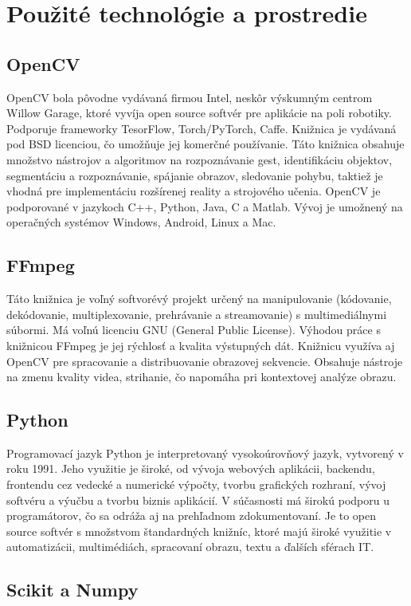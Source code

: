 \section{Použité technológie a prostredie}
\subsection{OpenCV}
\acrfull{OpenCV} bola pôvodne vydávaná firmou Intel, neskôr výskumným centrom Willow Garage, ktoré vyvíja open source softvér pre aplikácie na poli robotiky. Podporuje frameworky TesorFlow, Torch/PyTorch, Caffe. Knižnica je vydávaná pod BSD licenciou, čo umožňuje jej komerčné používanie. Táto knižnica obsahuje množstvo nástrojov a algoritmov na rozpoznávanie gest, identifikáciu objektov, segmentáciu a rozpoznávanie, spájanie obrazov, sledovanie pohybu, taktiež je vhodná pre implementáciu rozšírenej reality a strojového učenia. OpenCV je podporované v jazykoch C++, Python, Java, C a Matlab. Vývoj je umožnený na operačných systémov Windows, Android, Linux a Mac. \cite{c4}


\subsection{FFmpeg}
Táto knižnica je voľný softvorévý projekt určený na manipulovanie (kódovanie, dekódovanie, multiplexovanie, prehrávanie a streamovanie) s multimediálnymi súbormi. Má voľnú licenciu GNU (General Public License). Výhodou práce s knižnicou FFmpeg je jej rýchlosť a kvalita výstupných dát. Knižnicu využíva aj OpenCV pre spracovanie a distribuovanie obrazovej sekvencie. Obsahuje nástroje na zmenu kvality videa, strihanie, čo napomáha pri kontextovej analýze obrazu.\cite{c9}

\subsection{Python}
Programovací jazyk Python je interpretovaný vysokoúrovňový jazyk, vytvorený v roku 1991. Jeho využitie je široké, od vývoja webových aplikácii, backendu, frontendu cez vedecké a numerické výpočty, tvorbu grafických rozhraní, vývoj softvéru a výučbu a tvorbu biznis aplikácií. V súčasnosti má širokú podporu u programátorov, čo sa odráža aj na prehľadnom zdokumentovaní. Je to open source softvér s množstvom štandardných knižníc, ktoré majú široké využitie v automatizácii, multimédiách, spracovaní obrazu, textu a ďalších sférach IT.\cite{c6}
\subsection{Scikit a Numpy}

